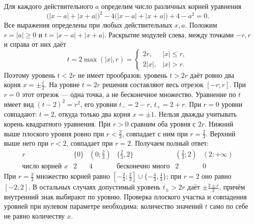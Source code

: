 \begin{example}\label{ex:review-ege-final-parameters-B}
Для каждого действительного \(a\) определим число различных корней уравнения
\[
\bigl(|x-a|+|x+a|\bigr)^2-4\bigl(|x-a|+|x+a|\bigr)+4-a^2=0.
\]
Все выражения определены при любых действительных \(x,a\). Положим \(r=|a|\ge0\) и \(t=|x-a|+|x+a|\). Раскрытие модулей слева, между точками \(-r,r\) и справа от них даёт
\[
t=2\max(|x|,r)=
\begin{cases}2r,&|x|\le r,\\2|x|,&|x|>r.\end{cases}
\]
Поэтому уровень \(t<2r\) не имеет прообразов; уровень \(t>2r\) даёт ровно два корня \(x=\pm\frac t2\). На уровне \(t=2r\) решения составляют весь отрезок \([-r;r]\). При \(r=0\) этот отрезок --- одна точка, а не бесконечное множество.
Уравнение по \(t\) имеет вид \((t-2)^2=r^2\), его уровни \(t_-=2-r\), \(t_+=2+r\). При \(r=0\) уровни совпадают: \(t=2\), откуда только два корня \(x=\pm1\). Нельзя дважды учитывать корень квадратного уравнения.
При \(r>0\) сравним оба уровня с \(2r\). Нижний выше плоского уровня ровно при \(r<\frac23\), совпадает с ним при \(r=\frac23\). Верхний выше него при \(r<2\), совпадает при \(r=2\). Получаем полный ответ:
\[
\begin{array}{c|ccccc}
r&\{0\}&(0;\frac23)&\{\frac23,2\}&(\frac23;2)&(2;+\infty)\\ \hline
\text{число корней }x&2&4&\text{бесконечно много}&2&0
\end{array}
\]
При \(r=\frac23\) множество корней равно \([-\frac23;\frac23]\cup\{-\frac43,\frac43\}\); при \(r=2\) оно равно \([-2;2]\). В остальных случаях допустимый уровень \(t_\pm>2r\) даёт \(\pm\frac{2\pm r}{2}\), причём внутренний знак выбирают по уровню. Проверка плоского участка и совпадения уровней при нулевом параметре необходима: количество значений \(t\) само по себе не равно количеству \(x\).
\end{example}

